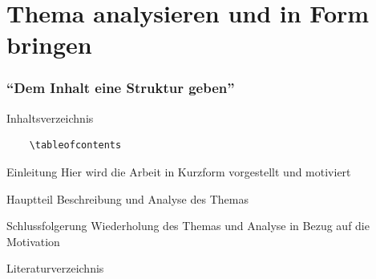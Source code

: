\section{Thema analysieren und in Form bringen}
\begin{frame}[fragile]
\frametitle{\enquote{Dem Inhalt eine Struktur geben}}

\begin{mybox}{Inhaltsverzeichnis}
  \small
  \color{green!30!black}
  \begin{verbatim}
    \tableofcontents
  \end{verbatim}
\vspace{-8mm}
\end{mybox}

\bigskip
\begin{mybox}{Einleitung}
Hier wird die Arbeit in Kurzform vorgestellt und motiviert 
\end{mybox}

\bigskip
\begin{mybox}{Hauptteil}
Beschreibung und Analyse des Themas  
\end{mybox}

\bigskip
\begin{mybox}{Schlussfolgerung}
Wiederholung des Themas und Analyse in Bezug auf die Motivation  
\end{mybox}

\bigskip
\begin{mybox}{Literaturverzeichnis}
  \small
  \color{green!30!black}
  \begin{verbatim}
    
    
  \end{verbatim}
\vspace{-8mm}
\end{mybox}
\end{frame}

